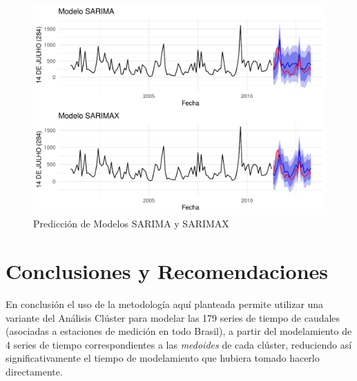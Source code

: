 \documentclass[12pt,oneside]{book}\usepackage[]{graphicx}\usepackage[]{color}
\makeatletter
\def\maxwidth{ %
  \ifdim\Gin@nat@width>\linewidth
    \linewidth
  \else
    \Gin@nat@width
  \fi
}
\newenvironment{knitrout}{}{} %
\theoremstyle{definition} %
\makeatother
\begin{document}
\begin{knitrout}
\color{fgcolor}\begin{figure}[h]

{\centering \includegraphics[width=\maxwidth]{figure/unnamed-chunk-63-1} 

}

\caption{\label{fig:predic14} Predicción de Modelos SARIMA y SARIMAX}\label{fig:unnamed-chunk-63}
\end{figure}


\end{knitrout}





\chapter{Conclusiones y Recomendaciones}





En conclusión el uso de la metodología aquí planteada permite utilizar una variante del Análisis Clúster para modelar las 179 series de tiempo de caudales (asociadas a estaciones de medición en todo Brasil), a partir del modelamiento de 4 series de tiempo correspondientes a las \textit{medoides} de cada clúster, reduciendo así significativamente el tiempo de modelamiento que hubiera tomado hacerlo directamente.
\end{document}
